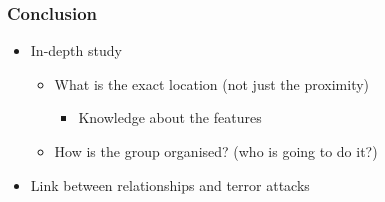 \begin{frame}
\frametitle{Conclusion}

\begin{itemize}
\item In-depth study
\begin{itemize}
\item What is the exact location (not just the proximity)
\begin{itemize}
\item Knowledge about the features
\end{itemize}
\item How is the group organised? (who is going to do it?)
\end{itemize}
\item Link between relationships and terror attacks
\end{itemize}
\end{frame}


